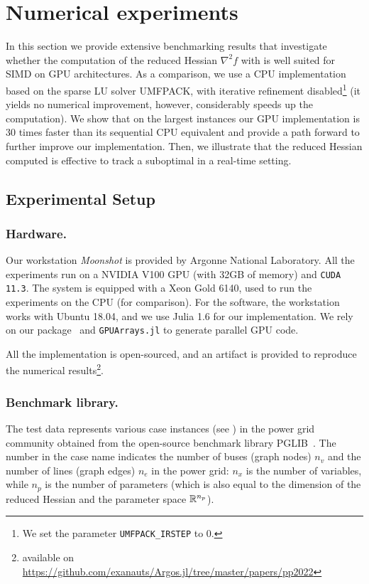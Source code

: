 \section{Numerical experiments}
\label{sec:results}
In this section we  provide extensive benchmarking results that investigate
whether the computation of the reduced Hessian $\nabla^2 f$ with 
is well suited for SIMD on GPU architectures.
As a comparison, we use a CPU implementation based on the sparse LU solver UMFPACK,
with iterative refinement disabled\footnote{We set the parameter {\tt UMFPACK\_IRSTEP} to 0.} (it yields no numerical
improvement, however, considerably speeds up the computation).
We show that on the largest instances our GPU implementation is 30 times faster than
its sequential CPU equivalent and provide a path forward to further improve our implementation.
Then, we illustrate that the reduced Hessian computed is effective to track a suboptimal in a real-time
setting.

\subsection{Experimental Setup}
\subsubsection{Hardware.}

Our workstation {\it Moonshot} is provided by Argonne National Laboratory.
All the experiments run on a NVIDIA V100 GPU (with 32GB of memory)
and {\tt CUDA 11.3}. The system is equipped with a Xeon Gold 6140, used to run the experiments on the CPU (for comparison).
For the software, the workstation works with Ubuntu 18.04,
and we use Julia 1.6 for our implementation.
We rely on our package \KA\ and \lstinline{GPUArrays.jl} to generate parallel GPU code.

All the implementation is open-sourced, and an artifact is provided to reproduce
the numerical results\footnote{available on \url{https://github.com/exanauts/Argos.jl/tree/master/papers/pp2022}}.

\subsubsection{Benchmark library.}
The test data represents various case instances (see
) in the power grid community obtained
from the open-source benchmark library PGLIB~\cite{babaeinejadsarookolaee2019power}.
The number in the case name
indicates the number of buses (graph nodes) $n_v$ and the number of lines (graph edges) $n_e$ in the power grid: $n_x$ is
the number of variables, while $n_p$ is the number of parameters (which
is also equal to the dimension of the reduced Hessian and the parameter space $\mathbb{R}^{n_p}$).


